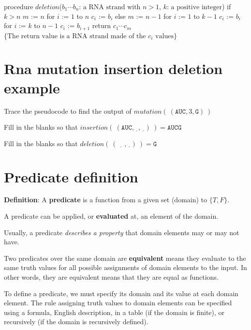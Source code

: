 \documentclass[12pt, oneside]{article}
\newcommand{\A}[0]{\texttt{A}}
\newcommand{\C}[0]{\texttt{C}}
\newcommand{\G}[0]{\texttt{G}}
\newcommand{\U}[0]{\texttt{U}}
\begin{document}
\begin{algorithm}
procedure $\textit{deletion}$($b_1\cdots b_n$: $\textrm{a RNA strand with } n>1$, $k$: $\textrm{a  positive integer}$)
if $k > n$
  $m$ := $n$
  for $i$ := $1$ to $n$
    $c_i$ := $b_i$
else
  $m$ := $n-1$
  for $i$ := $1$ to $k-1$ 
    $c_i$ := $b_i$
  for $i$ := $k$ to $n-1$
    $c_i$ := $b_{i+1}$
return $c_1\cdots c_m$ $\{ \textrm{The return value is a RNA strand made of the } c_i \textrm{ values}\}$
\end{algorithm}
 \vfill
\section*{Rna mutation insertion deletion example}


Trace the pseudocode to find the output of $\textit{mutation}(~ (\A\U\C, 3, \G) ~)$

\vspace{50pt}

Fill in the blanks so that $\textit{insertion}(~(\A\U\C, \underline{\phantom{3}}, \underline{\phantom{\G}})~) = \A\U\C\G$

\vspace{50pt}

Fill in the blanks so that $\textit{deletion}(~(\underline{\phantom{\G\G}}, \underline{\phantom{1}})~) =  \G$

\vspace{50pt}
 \vfill
\section*{Predicate definition}


{\bf  Definition}: A  {\bf predicate}  is  a function from a given set (domain) to $\{T,F\}$.

A predicate can be applied, or {\bf evaluated} at, an element of the domain.

Usually, a predicate {\it describes a  property} that domain elements may or may not have.

Two predicates over the same domain are {\bf equivalent} means they evaluate to
the same truth values for all possible assignments of domain elements to the
input. In other words, they are equivalent means that they are equal as functions.

To define a predicate, we must specify its domain and its value at each domain element.
The rule assigning truth values to domain elements can be specified using a formula, 
English description, in a table (if the domain is finite), or recursively (if the domain is recursively
defined). \vfill
\end{document}
